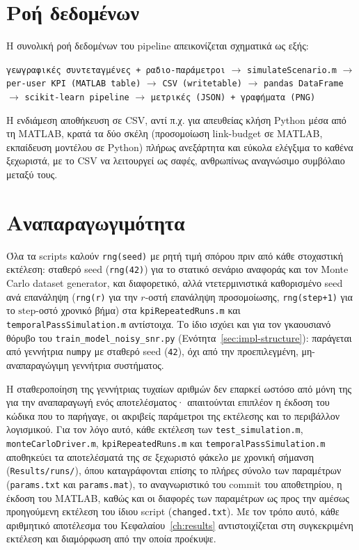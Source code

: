 \section{Ροή δεδομένων}
\label{sec:impl-dataflow}

Η συνολική ροή δεδομένων του pipeline απεικονίζεται σχηματικά ως εξής:

\begin{center}
\small
\texttt{γεωγραφικές συντεταγμένες + ραδιο-παράμετροι}
$\rightarrow$ \texttt{simulateScenario.m}
$\rightarrow$ \texttt{per-user KPI (MATLAB table)}
$\rightarrow$ \texttt{CSV (writetable)}
$\rightarrow$ \texttt{pandas DataFrame}
$\rightarrow$ \texttt{scikit-learn pipeline}
$\rightarrow$ \texttt{μετρικές (JSON) + γραφήματα (PNG)}
\end{center}

Η ενδιάμεση αποθήκευση σε CSV, αντί π.χ. για απευθείας κλήση Python μέσα
από τη MATLAB, κρατά τα δύο σκέλη (προσομοίωση link-budget σε MATLAB,
εκπαίδευση μοντέλου σε Python) πλήρως ανεξάρτητα και εύκολα ελέγξιμα το
καθένα ξεχωριστά, με το CSV να λειτουργεί ως σαφές, ανθρωπίνως αναγνώσιμο
συμβόλαιο μεταξύ τους.

\section{Αναπαραγωγιμότητα}
\label{sec:impl-reproducibility}

Όλα τα scripts καλούν \texttt{rng(seed)} με ρητή τιμή σπόρου πριν από κάθε
στοχαστική εκτέλεση: σταθερό seed (\texttt{rng(42)}) για το στατικό
σενάριο αναφοράς και τον Monte Carlo dataset generator, και διαφορετικό,
αλλά ντετερμινιστικά καθορισμένο seed ανά επανάληψη (\texttt{rng(r)} για
την $r$-οστή επανάληψη προσομοίωσης, \texttt{rng(step+1)} για το $\text{step}$-οστό χρονικό
βήμα) στα \texttt{kpiRepeatedRuns.m} και \texttt{temporalPassSimulation.m}
αντίστοιχα. Το ίδιο ισχύει και για τον γκαουσιανό θόρυβο του
\texttt{train\_model\_noisy\_snr.py} (Ενότητα~\ref{sec:impl-structure}):
παράγεται από γεννήτρια \texttt{numpy} με σταθερό seed (\texttt{42}), όχι
από την προεπιλεγμένη, μη-αναπαραγώγιμη γεννήτρια συστήματος.

Η σταθεροποίηση της γεννήτριας τυχαίων αριθμών δεν επαρκεί ωστόσο από
μόνη της για την αναπαραγωγή ενός αποτελέσματος· απαιτούνται επιπλέον η
έκδοση του κώδικα που το παρήγαγε, οι ακριβείς παράμετροι της εκτέλεσης
και το περιβάλλον λογισμικού. Για τον λόγο αυτό, κάθε εκτέλεση των
\texttt{test\_simulation.m}, \texttt{monteCarloDriver.m},
\texttt{kpiRepeatedRuns.m} και \texttt{temporalPassSimulation.m}
αποθηκεύει τα αποτελέσματά της σε ξεχωριστό φάκελο με χρονική σήμανση
(\texttt{Results/runs/}), όπου καταγράφονται επίσης το πλήρες σύνολο των
παραμέτρων (\texttt{params.txt} και \texttt{params.mat}), το αναγνωριστικό
του commit του αποθετηρίου, η έκδοση του MATLAB, καθώς και οι διαφορές των
παραμέτρων ως προς την αμέσως προηγούμενη εκτέλεση του ίδιου script
(\texttt{changed.txt}). Με τον τρόπο αυτό, κάθε αριθμητικό αποτέλεσμα του
Κεφαλαίου~\ref{ch:results} αντιστοιχίζεται στη συγκεκριμένη εκτέλεση και
διαμόρφωση από την οποία προέκυψε.

